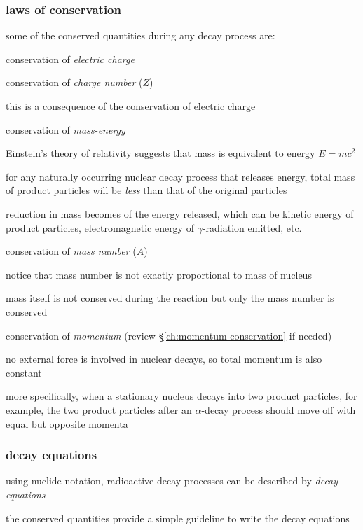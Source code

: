 \subsubsection{laws of conservation}

some of the conserved quantities during any decay process are:

\cmt conservation of \emph{electric charge}

\cmt conservation of \emph{charge number} ($Z$)

this is a consequence of the conservation of electric charge

\cmt conservation of \emph{mass-energy}

Einstein's theory of relativity suggests that mass is equivalent to energy $E=mc^2$

for any naturally occurring nuclear decay process that releases energy, total mass of product particles will be \emph{less} than that of the original particles

reduction in mass becomes of the energy released, which can be kinetic energy of product particles, electromagnetic energy of $\gamma$-radiation emitted, etc.

\cmt conservation of \emph{mass number} ($A$)

notice that mass number is not exactly proportional to mass of nucleus

mass itself is not conserved during the reaction but only the mass number is conserved

\cmt conservation of \emph{momentum} (review \S\ref{ch:momentum-conservation} if needed)

no external force is involved in nuclear decays, so total momentum is also constant

more specifically, when a stationary nucleus decays into two product particles, for example, the two product particles after an $\alpha$-decay process should move off with equal but opposite momenta


\subsubsection{decay equations}

using nuclide notation, radioactive decay processes can be described by \emph{decay equations}

the conserved quantities provide a simple guideline to write the decay equations 

